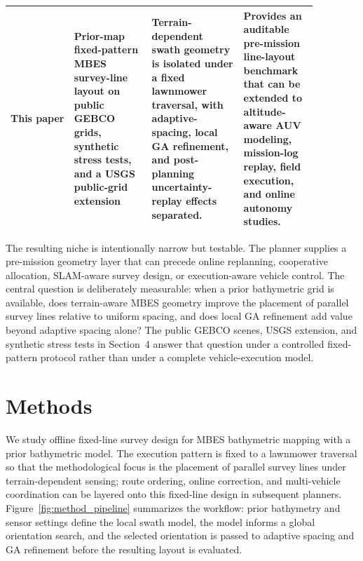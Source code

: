\documentclass[jmse,article,submit,moreauthors]{Definitions/mdpi}
\begin{document}
\begin{table}[!htbp]
\begin{tabular}{@{}>{\raggedright\arraybackslash}p{0.18\linewidth}>{\raggedright\arraybackslash}p{0.22\linewidth}>{\raggedright\arraybackslash}p{0.26\linewidth}>{\raggedright\arraybackslash}p{0.21\linewidth}@{}}
		This paper & Prior-map fixed-pattern MBES survey-line layout on public GEBCO grids, synthetic stress tests, and a USGS public-grid extension & Terrain-dependent swath geometry is isolated under a fixed lawnmower traversal, with adaptive-spacing, local GA refinement, and post-planning uncertainty-replay effects separated. & Provides an auditable pre-mission line-layout benchmark that can be extended to altitude-aware AUV modeling, mission-log replay, field execution, and online autonomy studies. \\
		\bottomrule[1bp]
	\end{tabular}
\end{table}

The resulting niche is intentionally narrow but testable. The planner supplies a pre-mission geometry layer that can precede online replanning, cooperative allocation, SLAM-aware survey design, or execution-aware vehicle control. The central question is deliberately measurable: when a prior bathymetric grid is available, does terrain-aware MBES geometry improve the placement of parallel survey lines relative to uniform spacing, and does local GA refinement add value beyond adaptive spacing alone? The public GEBCO scenes, USGS extension, and synthetic stress tests in Section~4 answer that question under a controlled fixed-pattern protocol rather than under a complete vehicle-execution model.

\section{Methods}
\label{sec:methods}
We study offline fixed-line survey design for MBES bathymetric mapping with a prior bathymetric model. The execution pattern is fixed to a lawnmower traversal so that the methodological focus is the placement of parallel survey lines under terrain-dependent sensing; route ordering, online correction, and multi-vehicle coordination can be layered onto this fixed-line design in subsequent planners. Figure~\ref{fig:method_pipeline} summarizes the workflow: prior bathymetry and sensor settings define the local swath model, the model informs a global orientation search, and the selected orientation is passed to adaptive spacing and GA refinement before the resulting layout is evaluated.
\end{document}
